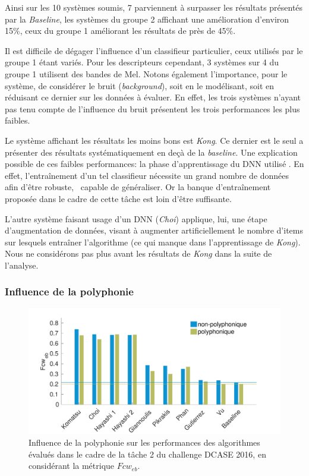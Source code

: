 Ainsi sur les 10 systèmes soumis, 7 parviennent à surpasser les résultats présentés par la \emph{Baseline}, les systèmes du groupe 2 affichant une amélioration d'environ 15\%, ceux du groupe 1 améliorant les résultats de près de 45\%.

Il est difficile de dégager l'influence d'un classifieur particulier, ceux utilisés par le groupe 1 étant variés. Pour les descripteurs cependant, 3 systèmes sur 4 du groupe 1 utilisent des bandes de Mel. Notons également l'importance, pour le système, de considérer le bruit (\emph{background}), soit en le modélisant, soit en réduisant ce dernier sur les données à évaluer. En effet, les trois systèmes n'ayant pas tenu compte de l'influence du bruit présentent les trois performances les plus faibles.

Le système affichant les résultats les moins bons est \emph{Kong}. Ce dernier est le seul a présenter des résultats systématiquement en deçà de la \emph{baseline}. Une explication possible de ces faibles performances: la phase d'apprentissage du DNN utilisé \citep{Kong2016}. En effet, l’entraînement d'un tel classifieur nécessite un grand nombre de données afin d'être robuste, \ie~capable de généraliser. Or la banque d'entraînement proposée dans le cadre de cette tâche est loin d'être suffisante. 

L'autre système faisant usage d'un DNN (\emph{Choi}) applique, lui, une étape d'augmentation de données, visant à augmenter artificiellement le nombre d'items sur lesquels entraîner l'algorithme \citep{Choi2016} (ce qui manque dans l'apprentissage de \emph{Kong}). Nous ne considérons pas plus avant les résultats de \emph{Kong} dans la suite de l'analyse.

\subsubsection{Influence de la polyphonie}

\begin{figure}[t]
\includegraphics[width=1\textwidth]{gfx/ch_7/results_overall_poly_eb_class_wise_average_F_7}
\caption{Influence de la polyphonie sur les performances des algorithmes évalués dans le cadre de la tâche 2 du challenge DCASE 2016, en considérant la métrique $Fcw_{eb}$.}
\label{fig:overall_poly_eb_class_wise_F}
\end{figure}

